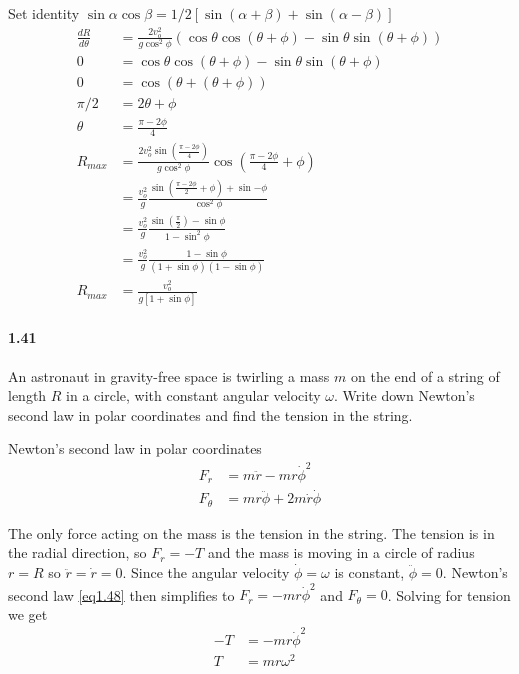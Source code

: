 \documentclass[../problems.tex]{subfiles}
\begin{document}
Set identity $\sin{\alpha}\cos{\beta}=1/2[\sin{(\alpha+\beta)}+\sin{(\alpha-\beta)}]$
\begin{align*}
    \frac{dR}{d\theta} &= \frac{2v_o^2}{g \cos^2{\phi}} \left( \cos{\theta} 
    \cos{\left(\theta + \phi\right)} - \sin{\theta} \sin{\left(\theta + \phi\right)} \right) \\
    0 &= \cos{\theta} \cos{\left(\theta + \phi\right)} 
    - \sin{\theta} \sin{\left(\theta + \phi\right)} \\
    0 &= \cos{\left(\theta + (\theta+\phi)\right)} \\
    \pi/2 &= 2\theta + \phi \\
    \theta &= \frac{\pi-2\phi}{4} \\
    R_{max} &= \frac{2v_o^2 \sin{\left(\frac{\pi-2\phi}{4}\right)}}{g \cos^2{\phi}} 
    \cos{\left(\frac{\pi-2\phi}{4} + \phi\right)} \\
    &= \frac{v_o^2}{g} \frac{\sin{\left(\frac{\pi-2\phi}{2}+\phi\right)} 
    + \sin{-\phi}}{\cos^2{\phi}} \\
    &= \frac{v_o^2}{g} \frac{\sin{\left(\frac{\pi}{2}\right)} - \sin{\phi}}{1-\sin^2{\phi}} \\
    &= \frac{v_o^2}{g} \frac{1 - \sin{\phi}}{(1+\sin{\phi})(1-\sin{\phi})} \\
    R_{max} &= \frac{v_o^2}{g[1+\sin{\phi}]}
\end{align*}
\newpage
\paragraph{1.41}
An astronaut in gravity-free space is twirling a mass $m$ on the end of a string of length $R$ in a 
circle, with constant angular velocity $\omega$. Write down Newton's second law in polar coordinates 
and find the tension in the string.
\barh

Newton's second law in polar coordinates
\begin{align*} \tag{1.48} \label{eq1.48}
    F_r &= m \ddot{r} - m r \dot{\phi}^2 \\
    F_\theta &= m r \ddot{\phi} + 2 m \dot{r} \dot{\phi}
\end{align*}

The only force acting on the mass is the tension in the string. The tension is in the radial 
direction, so $F_r=-T$ and the mass is moving in a circle of radius $r=R$ so $\ddot{r} = \dot{r}=0$. 
Since the angular velocity $\dot \phi = \omega$ is constant, $\ddot{\phi} = 0$. Newton's second law 
\eqref{eq1.48} then simplifies to $F_r = -m r \dot{\phi}^2 $ and $F_\theta = 0$. Solving for tension 
we get
\begin{align*}
    -T &= -m r \dot{\phi}^2 \\
    T &= m r \omega^2
\end{align*}
\end{document}
